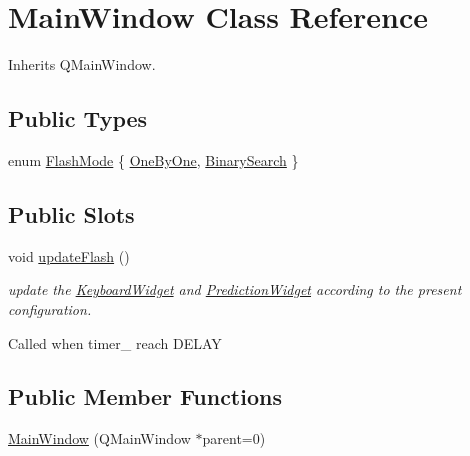 \hypertarget{class_main_window}{\section{Main\-Window Class Reference}
\label{class_main_window}
}


Inherits Q\-Main\-Window.

\subsection*{Public Types}
\begin{DoxyCompactItemize}
\item 
enum \hyperlink{class_main_window_a44abd7eed6ee23341cb378e6dbf60652}{Flash\-Mode} \{ \hyperlink{class_main_window_a44abd7eed6ee23341cb378e6dbf60652aff8e22f74aaba6a40ec3c140d15b4a56}{One\-By\-One}, 
\hyperlink{class_main_window_a44abd7eed6ee23341cb378e6dbf60652a445b710505a2c84dff02b98a2f1ba11a}{Binary\-Search}
 \}
\end{DoxyCompactItemize}
\subsection*{Public Slots}
\begin{DoxyCompactItemize}
\item 
\hypertarget{class_main_window_a2c60fa94bf903a2fd73fd5ab9c743d61}{void \hyperlink{class_main_window_a2c60fa94bf903a2fd73fd5ab9c743d61}{update\-Flash} ()}\label{class_main_window_a2c60fa94bf903a2fd73fd5ab9c743d61}

\begin{DoxyCompactList}\small\item\em update the \hyperlink{class_keyboard_widget}{Keyboard\-Widget} and \hyperlink{class_prediction_widget}{Prediction\-Widget} according to the present configuration. \par
 Called when timer\-\_\- reach D\-E\-L\-A\-Y \end{DoxyCompactList}\end{DoxyCompactItemize}
\subsection*{Public Member Functions}
\begin{DoxyCompactItemize}
\item 
\hyperlink{class_main_window_ab7d94977fe4f15c9850f3e4928e02672}{Main\-Window} (Q\-Main\-Window $\ast$parent=0)
\end{DoxyCompactItemize}
